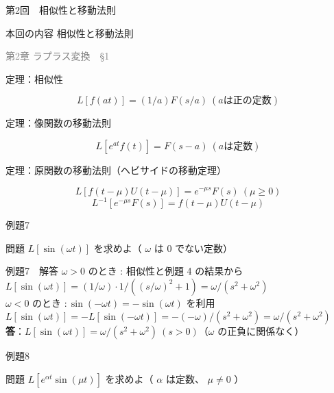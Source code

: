 \documentclass[professionalfonts]{beamer}
\begin{document}
\begin{frame}{第2回　相似性と移動法則}
  \begin{block}{本回の内容}
  相似性と移動法則
  \end{block}
  \vfill\hfill{\scriptsize \textcolor{gray}{第2章 ラプラス変換　§1}}
\end{frame}

\begin{frame}{定理：相似性}
  \begin{block}{}
  \[
    L[f(at)] = (1/a) F(s/a) \ (a は正の定数)
  \]
  \end{block}
\end{frame}

\begin{frame}{定理：像関数の移動法則}
  \begin{block}{}
  \[
    L[e^{at}f(t)] = F(s-a) \ (a は定数)
  \]
  \end{block}
\end{frame}

\begin{frame}{定理：原関数の移動法則（ヘビサイドの移動定理）}
  \begin{block}{}
  \[
    L[f(t-\mu)U(t-\mu)] = e^{-\mu s}F(s) \ (\mu \geq 0)
  \]
  \[
    L^{-1}[e^{-\mu s}F(s)] = f(t-\mu)U(t-\mu)
  \]
  \end{block}
\end{frame}

\begin{frame}{例題7}
  \begin{exampleblock}{問題}
    $L[\sin(\omega t)]$ を求めよ（ $\omega$ は 0 でない定数）\\[2pt]
  \end{exampleblock}
\end{frame}

\begin{frame}{例題7　解答}
  $\omega > 0$ のとき : 相似性と例題 4 の結果から\\[4pt]
  $L[\sin(\omega t)] = (1/\omega) \cdot 1/((s/\omega)^{2}+1) = \omega/(s^{2}+\omega^{2})$\\[4pt]
  $\omega < 0$ のとき $: \sin(-\omega t) = -\sin(\omega t)$ を利用\\[4pt]
  $L[\sin(\omega t)] = -L[\sin(-\omega t)] = -(-\omega)/(s^{2}+\omega^{2}) = \omega/(s^{2}+\omega^{2})$
  \medskip\textbf{答}：$L[\sin(\omega t)] = \omega/(s^{2}+\omega^{2}) \ (s > 0)$（$\omega$ の正負に関係なく）
\end{frame}

\begin{frame}{例題8}
  \begin{exampleblock}{問題}
    $L[e^{\alpha t}\sin(\mu t)]$ を求めよ（ $\alpha$ は定数、 $\mu \neq 0$ ）\\[2pt]
  \end{exampleblock}
\end{frame}
\end{document}
